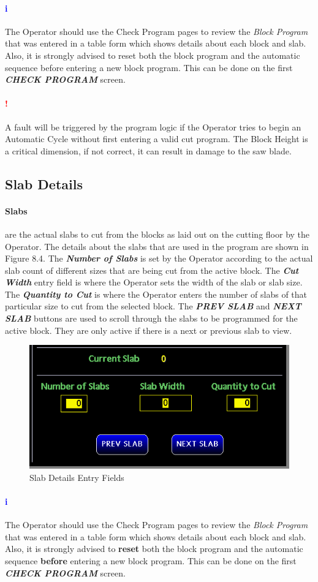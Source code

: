 	\paragraph{\textbf{\LARGE \textcolor{blue}{i}}}The Operator should use the Check Program pages to review the \textit{Block Program} that was entered in a table form which shows details about each block and slab. Also, it is strongly advised to reset both the block program and the automatic sequence before entering a new block program. This can be done on the first \textbf{\textit{CHECK PROGRAM}} screen.
\paragraph*{\textbf{{\LARGE \textcolor{red}{!}}}}A fault will be triggered by the program logic if the Operator tries to begin an Automatic Cycle without first entering a valid cut program. The Block Height is a critical dimension, if not correct, it can result in damage to the saw blade.
\pagebreak
\subsection{Slab Details}\paragraph*{Slabs}are the actual slabs to cut from the blocks as laid out on the cutting floor by the Operator. The details about the slabs that are used in the program are shown in Figure 8.4. The \textbf{\textit{Number of Slabs}} is set by the Operator according to the actual slab count of different sizes that are being cut from the active block. The \textbf{\textit{Cut Width}} entry field is where the Operator sets the width of the slab or slab size. The \textbf{\textit{Quantity to Cut}} is where the Operator enters the number of slabs of that particular size to cut from the selected block. The \textbf{\textit{PREV SLAB}}
and \textbf{\textit{NEXT SLAB}} buttons are used to scroll through the slabs to be programmed for the active block. They are only active if there is a next or previous slab to view.
\begin{figure}
	\centering
	\includegraphics[width=.2\linewidth]{screen-captures/program/cut-pgm-slab}
	\caption{Slab Details Entry Fields}
	\label{fig:cut-pgm-slab-entry}
\end{figure}
\paragraph{\textbf{\LARGE \textcolor{blue}{i}}}The Operator should use the Check Program pages to review the \textit{Block Program} that was entered in a table form which shows details about each block and slab. Also, it is strongly advised to \textbf{reset} both the block program and the automatic sequence \textbf{before} entering a new block program. This can be done on the first \textbf{\textit{CHECK PROGRAM}} screen.